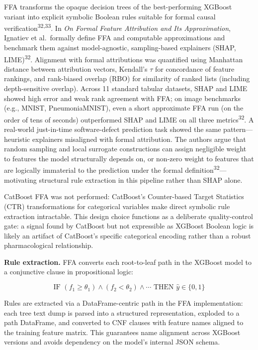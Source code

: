 \documentclass[
  12pt,
]{book}
\begin{document}
FFA transforms the opaque decision trees of the best-performing XGBoost
variant into explicit symbolic Boolean rules suitable for formal causal
verification\textsuperscript{32,33}. In \emph{On Formal Feature
Attribution and Its Approximation}, Ignatiev et al.~formally define FFA
and computable approximations and benchmark them against model-agnostic,
sampling-based explainers (SHAP, LIME)\textsuperscript{32}. Alignment
with formal attributions was quantified using Manhattan distance between
attribution vectors, Kendall's \(\tau\) for concordance of feature
rankings, and rank-biased overlap (RBO) for similarity of ranked lists
(including depth-sensitive overlap). Across 11 standard tabular
datasets, SHAP and LIME showed high error and weak rank agreement with
FFA; on image benchmarks (e.g., MNIST, PneumoniaMNIST), even a short
approximate FFA run (on the order of tens of seconds) outperformed SHAP
and LIME on all three metrics\textsuperscript{32}. A real-world
just-in-time software-defect prediction task showed the same
pattern---heuristic explainers misaligned with formal attribution. The
authors argue that random sampling and local surrogate constructions can
assign negligible weight to features the model structurally depends on,
or non-zero weight to features that are logically immaterial to the
prediction under the formal definition\textsuperscript{32}---motivating
structural rule extraction in this pipeline rather than SHAP alone.

CatBoost FFA was not performed: CatBoost's Counter-based Target
Statistics (CTR) transformations for categorical variables make direct
symbolic rule extraction intractable. This design choice functions as a
deliberate quality-control gate: a signal found by CatBoost but not
expressible as XGBoost Boolean logic is likely an artifact of CatBoost's
specific categorical encoding rather than a robust pharmacological
relationship.

\textbf{Rule extraction.} FFA converts each root-to-leaf path in the
XGBoost model to a conjunctive clause in propositional logic:

\[\text{IF } (f_1 \geq \theta_1) \wedge (f_2 < \theta_2) \wedge \cdots
  \text{ THEN } \hat{y} \in \{0, 1\}\]

Rules are extracted via a DataFrame-centric path in the FFA
implementation: each tree text dump is parsed into a structured
representation, exploded to a path DataFrame, and converted to CNF
clauses with feature names aligned to the training feature matrix. This
guarantees name alignment across XGBoost versions and avoids dependency
on the model's internal JSON schema.
\end{document}
